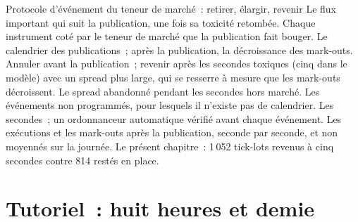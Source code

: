 \begin{strategyfile}{Protocole d'événement du teneur de marché~: retirer, élargir, revenir}\label{strat:hf:news-and-event-trading:protocol}
 Le flux important qui suit la publication, une fois sa toxicité retombée.
 Chaque instrument coté par le teneur de marché que la publication fait bouger.
 Le calendrier des publications~; après la publication, la décroissance des mark-outs.
 Annuler avant la publication~; revenir après les secondes toxiques (cinq dans le modèle) avec un spread plus large, qui se resserre
à mesure que les mark-outs décroissent.
 Le spread abandonné pendant les secondes hors marché.
 Les événements non programmés, pour lesquels il n'existe pas de calendrier.
 Les secondes~; un ordonnanceur automatique vérifié avant chaque événement.
 Les exécutions et les mark-outs après la publication, seconde par seconde, et non moyennés sur la journée.
 Le présent chapitre~: 1\,052 tick-lots revenus à cinq secondes contre 814 restés en place.
\end{strategyfile}

\section{Tutoriel~: huit heures et demie}\label{tut:hf:news-and-event-trading:tut}

